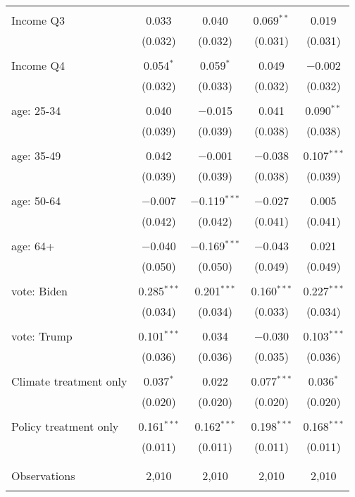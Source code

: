 \begin{tabular}{@{\extracolsep{5pt}}lcccc}
  & & & & \\ 
 Income Q3 & 0.033 & 0.040 & 0.069$^{**}$ & 0.019 \\ 
  & (0.032) & (0.032) & (0.031) & (0.031) \\ 
  & & & & \\ 
 Income Q4 & 0.054$^{*}$ & 0.059$^{*}$ & 0.049 & $-$0.002 \\ 
  & (0.032) & (0.033) & (0.032) & (0.032) \\ 
  & & & & \\ 
 age: 25-34 & 0.040 & $-$0.015 & 0.041 & 0.090$^{**}$ \\ 
  & (0.039) & (0.039) & (0.038) & (0.038) \\ 
  & & & & \\ 
 age: 35-49 & 0.042 & $-$0.001 & $-$0.038 & 0.107$^{***}$ \\ 
  & (0.039) & (0.039) & (0.038) & (0.039) \\ 
  & & & & \\ 
 age: 50-64 & $-$0.007 & $-$0.119$^{***}$ & $-$0.027 & 0.005 \\ 
  & (0.042) & (0.042) & (0.041) & (0.041) \\ 
  & & & & \\ 
 age: 64+ & $-$0.040 & $-$0.169$^{***}$ & $-$0.043 & 0.021 \\ 
  & (0.050) & (0.050) & (0.049) & (0.049) \\ 
  & & & & \\ 
 vote: Biden & 0.285$^{***}$ & 0.201$^{***}$ & 0.160$^{***}$ & 0.227$^{***}$ \\ 
  & (0.034) & (0.034) & (0.033) & (0.034) \\ 
  & & & & \\ 
 vote: Trump & 0.101$^{***}$ & 0.034 & $-$0.030 & 0.103$^{***}$ \\ 
  & (0.036) & (0.036) & (0.035) & (0.036) \\ 
  & & & & \\ 
 Climate treatment only & 0.037$^{*}$ & 0.022 & 0.077$^{***}$ & 0.036$^{*}$ \\ 
  & (0.020) & (0.020) & (0.020) & (0.020) \\ 
  & & & & \\ 
 Policy treatment only & 0.161$^{***}$ & 0.162$^{***}$ & 0.198$^{***}$ & 0.168$^{***}$ \\ 
  & (0.011) & (0.011) & (0.011) & (0.011) \\ 
  & & & & \\ 
\hline \\[-1.8ex] 

Observations & 2,010 & 2,010 & 2,010 & 2,010 \\ 
\hline 
\hline \\[-1.8ex] 
\end{tabular} 